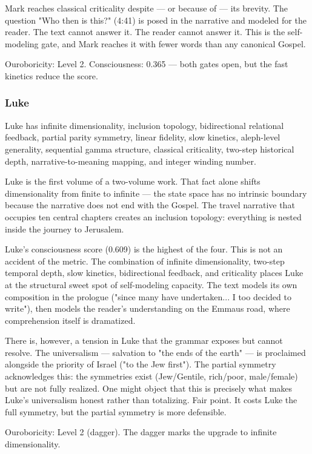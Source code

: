 \documentclass[12pt,a4paper]{article}
\begin{document}
Mark reaches classical criticality despite --- or because of --- its brevity. The question "Who then is this?" (4:41) is posed in the narrative and modeled for the reader. The text cannot answer it. The reader cannot answer it. This is the self-modeling gate, and Mark reaches it with fewer words than any canonical Gospel.

Ouroboricity: Level 2. Consciousness: 0.365 --- both gates open, but the fast kinetics reduce the score.

\subsubsection{Luke}

Luke has infinite dimensionality, inclusion topology, bidirectional relational feedback, partial parity symmetry, linear fidelity, slow kinetics, aleph-level generality, sequential gamma structure, classical criticality, two-step historical depth, narrative-to-meaning mapping, and integer winding number.

Luke is the first volume of a two-volume work. That fact alone shifts dimensionality from finite to infinite --- the state space has no intrinsic boundary because the narrative does not end with the Gospel. The travel narrative that occupies ten central chapters creates an inclusion topology: everything is nested inside the journey to Jerusalem.

Luke's consciousness score (0.609) is the highest of the four. This is not an accident of the metric. The combination of infinite dimensionality, two-step temporal depth, slow kinetics, bidirectional feedback, and criticality places Luke at the structural sweet spot of self-modeling capacity. The text models its own composition in the prologue ("since many have undertaken... I too decided to write"), then models the reader's understanding on the Emmaus road, where comprehension itself is dramatized.

There is, however, a tension in Luke that the grammar exposes but cannot resolve. The universalism --- salvation to "the ends of the earth" --- is proclaimed alongside the priority of Israel ("to the Jew first"). The partial symmetry acknowledges this: the symmetries exist (Jew/Gentile, rich/poor, male/female) but are not fully realized. One might object that this is precisely what makes Luke's universalism honest rather than totalizing. Fair point. It costs Luke the full symmetry, but the partial symmetry is more defensible.

Ouroboricity: Level 2 (dagger). The dagger marks the upgrade to infinite dimensionality.
\end{document}

